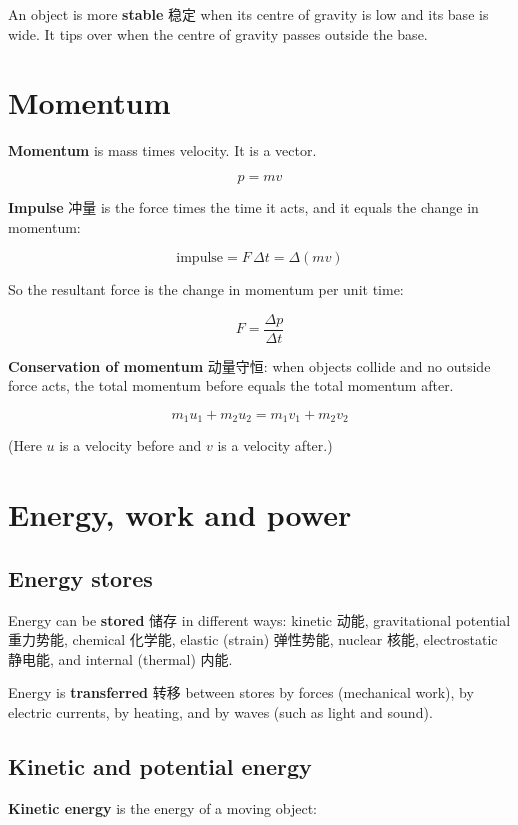 \documentclass[11pt]{article}
\begin{document}
An object is more \textbf{stable} 稳定 when its centre of gravity is low and its base is wide. It tips over when the centre of gravity passes outside the base.

\section*{Momentum}

\textbf{Momentum} is mass times velocity. It is a vector.

\[
p = mv
\]

\textbf{Impulse} 冲量 is the force times the time it acts, and it equals the change in momentum:

\[
\text{impulse} = F\,\Delta t = \Delta(mv)
\]

So the resultant force is the change in momentum per unit time:

\[
F = \frac{\Delta p}{\Delta t}
\]

\textbf{Conservation of momentum} 动量守恒: when objects collide and no outside force acts, the total momentum before equals the total momentum after.

\[
m_1 u_1 + m_2 u_2 = m_1 v_1 + m_2 v_2
\]

(Here $u$ is a velocity before and $v$ is a velocity after.)

\section*{Energy, work and power}

\subsection*{Energy stores}

Energy can be \textbf{stored} 储存 in different ways: kinetic 动能, gravitational potential 重力势能, chemical 化学能, elastic (strain) 弹性势能, nuclear 核能, electrostatic 静电能, and internal (thermal) 内能.

Energy is \textbf{transferred} 转移 between stores by forces (mechanical work), by electric currents, by heating, and by waves (such as light and sound).

\subsection*{Kinetic and potential energy}

\textbf{Kinetic energy} is the energy of a moving object:
\end{document}
